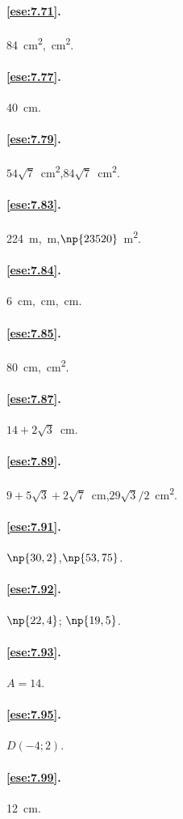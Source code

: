 \paragraph{\ref{ese:7.71}.}
84~cm\textsuperscript{2},~cm\textsuperscript{2}.

\paragraph{\ref{ese:7.77}.}
40~cm.

\paragraph{\ref{ese:7.79}.}
$54\sqrt{7}$~cm\textsuperscript{2},\quad $84\sqrt{7}$~cm\textsuperscript{2}.

\paragraph{\ref{ese:7.83}.}
224~m,~m,\quad $\np{23520}$~m\textsuperscript{2}.

\paragraph{\ref{ese:7.84}.}
6~cm,~cm,~cm.

\paragraph{\ref{ese:7.85}.}
80~cm,~cm\textsuperscript{2}.

\paragraph{\ref{ese:7.87}.}
$14 + 2\sqrt{3}$~cm.

\paragraph{\ref{ese:7.89}.}
$9 + 5\sqrt{3} + 2\sqrt{7}$~cm,\quad $29\sqrt{3}/2$~cm\textsuperscript{2}.

\paragraph{\ref{ese:7.91}.}
$\np{30,2}$,\quad $\np{53,75}$.

\paragraph{\ref{ese:7.92}.}
$\np{22,4}$; $\np{19,5}$.

\paragraph{\ref{ese:7.93}.}
$A=14$.

\paragraph{\ref{ese:7.95}.}
$D(-4;2)$.

\paragraph{\ref{ese:7.99}.}
12~cm.

\endgroup
